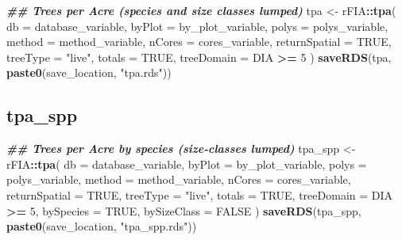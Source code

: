 \documentclass[
]{book}
\newenvironment{Shaded}{\begin{snugshade}}{\end{snugshade}}
\newcommand{\AttributeTok}[1]{\textcolor[rgb]{0.13,0.29,0.53}{#1}}
\newcommand{\ConstantTok}[1]{\textcolor[rgb]{0.56,0.35,0.01}{#1}}
\newcommand{\DecValTok}[1]{\textcolor[rgb]{0.00,0.00,0.81}{#1}}
\newcommand{\DocumentationTok}[1]{\textcolor[rgb]{0.56,0.35,0.01}{\textbf{\textit{#1}}}}
\newcommand{\FunctionTok}[1]{\textcolor[rgb]{0.13,0.29,0.53}{\textbf{#1}}}
\newcommand{\NormalTok}[1]{#1}
\newcommand{\OtherTok}[1]{\textcolor[rgb]{0.56,0.35,0.01}{#1}}
\newcommand{\SpecialCharTok}[1]{\textcolor[rgb]{0.81,0.36,0.00}{\textbf{#1}}}
\newcommand{\StringTok}[1]{\textcolor[rgb]{0.31,0.60,0.02}{#1}}
\begin{document}
\begin{Shaded}
\begin{Highlighting}[]
\DocumentationTok{\#\# Trees per Acre (species and size classes lumped)}
\NormalTok{tpa }\OtherTok{\textless{}{-}}\NormalTok{ rFIA}\SpecialCharTok{::}\FunctionTok{tpa}\NormalTok{(}
  \AttributeTok{db =}\NormalTok{ database\_variable,}
  \AttributeTok{byPlot =}\NormalTok{ by\_plot\_variable,}
  \AttributeTok{polys =}\NormalTok{ polys\_variable,}
  \AttributeTok{method =}\NormalTok{ method\_variable,}
  \AttributeTok{nCores =}\NormalTok{ cores\_variable,}
  \AttributeTok{returnSpatial =} \ConstantTok{TRUE}\NormalTok{,}
  \AttributeTok{treeType =} \StringTok{"live"}\NormalTok{,}
  \AttributeTok{totals =} \ConstantTok{TRUE}\NormalTok{,}
  \AttributeTok{treeDomain =}\NormalTok{ DIA }\SpecialCharTok{\textgreater{}=} \DecValTok{5}
\NormalTok{) }
\FunctionTok{saveRDS}\NormalTok{(tpa, }\FunctionTok{paste0}\NormalTok{(save\_location, }\StringTok{"tpa.rds"}\NormalTok{))}
\end{Highlighting}
\end{Shaded}

\hypertarget{tpa_spp}{%
\subsection{tpa\_spp}\label{tpa_spp}}

\begin{Shaded}
\begin{Highlighting}[]
\DocumentationTok{\#\# Trees per Acre by species (size{-}classes lumped)}
\NormalTok{tpa\_spp }\OtherTok{\textless{}{-}}\NormalTok{ rFIA}\SpecialCharTok{::}\FunctionTok{tpa}\NormalTok{(}
  \AttributeTok{db =}\NormalTok{ database\_variable,}
  \AttributeTok{byPlot =}\NormalTok{ by\_plot\_variable,}
  \AttributeTok{polys =}\NormalTok{ polys\_variable,}
  \AttributeTok{method =}\NormalTok{ method\_variable,}
  \AttributeTok{nCores =}\NormalTok{ cores\_variable,}
  \AttributeTok{returnSpatial =} \ConstantTok{TRUE}\NormalTok{,}
  \AttributeTok{treeType =} \StringTok{"live"}\NormalTok{,}
  \AttributeTok{totals =} \ConstantTok{TRUE}\NormalTok{,}
  \AttributeTok{treeDomain =}\NormalTok{ DIA }\SpecialCharTok{\textgreater{}=} \DecValTok{5}\NormalTok{,}
  \AttributeTok{bySpecies =} \ConstantTok{TRUE}\NormalTok{,}
  \AttributeTok{bySizeClass =} \ConstantTok{FALSE}
\NormalTok{) }
\FunctionTok{saveRDS}\NormalTok{(tpa\_spp, }\FunctionTok{paste0}\NormalTok{(save\_location, }\StringTok{"tpa\_spp.rds"}\NormalTok{))}
\end{Highlighting}
\end{Shaded}
\end{document}
